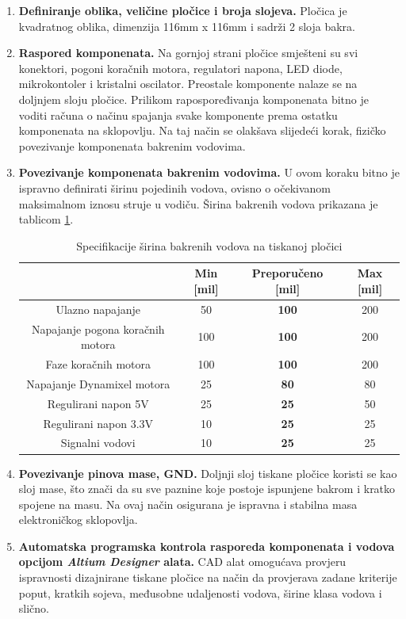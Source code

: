 \documentclass[11pt,a4paper]{article}
\begin{document}
\begin{center}
	\begin{enumerate}
		\item \textbf{Definiranje oblika, veličine pločice i broja slojeva.} Pločica je kvadratnog oblika, dimenzija 116mm x 116mm i sadrži 2 sloja bakra.
		
		\item \textbf{Raspored komponenata.} Na gornjoj strani pločice smješteni su svi konektori, pogoni koračnih motora, regulatori napona, LED diode, mikrokontoler i kristalni oscilator. Preostale komponente nalaze se na doljnjem sloju pločice. Prilikom rapospoređivanja komponenata bitno je voditi računa o načinu spajanja svake komponente prema ostatku komponenata na sklopovlju. Na taj način se olakšava slijedeći korak, fizičko povezivanje komponenata bakrenim vodovima.
		\item \textbf{Povezivanje komponenata bakrenim vodovima.} U ovom koraku bitno je ispravno definirati širinu pojedinih vodova, ovisno o očekivanom maksimalnom iznosu struje u vodiču. Širina bakrenih vodova prikazana je tablicom \ref{tab:specifikacija_pcb_with}.

\begin{table}[H]
	\centering
	\caption{Specifikacije širina bakrenih vodova na tiskanoj pločici}
	\label{tab:specifikacija_pcb_with}
	\begin{tabular}{|c|c|c|c|}
			\hline 
		  					& \textbf{Min [mil]} 	& \textbf{Preporučeno [mil]}	& \textbf{Max [mil]} \\ \hline  \hline
		 Ulazno napajanje 	& 50 	& \textbf{100} 			& 200 \\ \hline
		 Napajanje pogona koračnih motora 	& 100 	& \textbf{100} 			& 200 \\ \hline
		 Faze koračnih motora 	& 100 	& \textbf{100} 			& 200 \\ \hline
		 Napajanje Dynamixel motora 	& 25 	& \textbf{80} 			& 80 \\ \hline
		 Regulirani napon 5V 	& 25 	& \textbf{25} 			& 50 \\ \hline
		 Regulirani napon 3.3V 	& 10 	& \textbf{25} 			& 25 \\ \hline
		 Signalni vodovi 	& 10 	& \textbf{25}			& 25 \\ \hline
	\end{tabular}
\end{table}		

		\item \textbf{Povezivanje pinova mase, GND.} Doljnji sloj tiskane pločice koristi se kao sloj mase, što znači da su sve paznine koje postoje ispunjene bakrom i kratko spojene na masu. Na ovaj način osigurana je ispravna i stabilna masa elektroničkog sklopovlja.
		\item \textbf{Automatska programska kontrola rasporeda komponenata i vodova opcijom \textit{Altium Designer} alata.} CAD alat omogućava provjeru ispravnosti dizajnirane tiskane pločice na način da provjerava zadane kriterije poput, kratkih sojeva, međusobne udaljenosti vodova, širine klasa vodova i slično.
	\end{enumerate}
\end{center}
\end{document}
